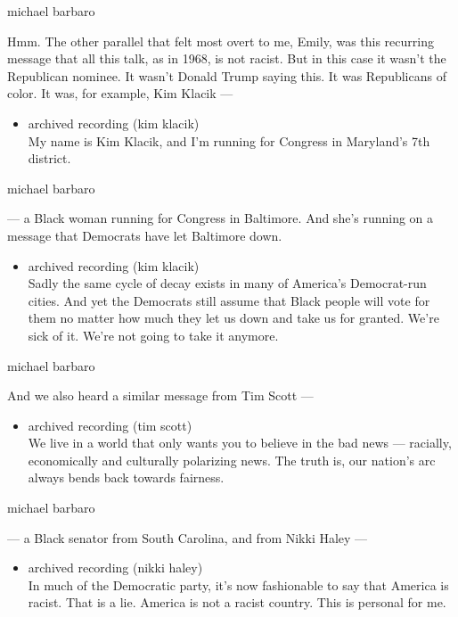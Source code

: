 michael barbaro

Hmm. The other parallel that felt most overt to me, Emily, was this
recurring message that all this talk, as in 1968, is not racist. But in
this case it wasn't the Republican nominee. It wasn't Donald Trump
saying this. It was Republicans of color. It was, for example, Kim
Klacik ---

\begin{itemize}
\tightlist
\item
  archived recording (kim klacik)\\
  My name is Kim Klacik, and I'm running for Congress in Maryland's 7th
  district.
\end{itemize}

michael barbaro

--- a Black woman running for Congress in Baltimore. And she's running
on a message that Democrats have let Baltimore down.

\begin{itemize}
\tightlist
\item
  archived recording (kim klacik)\\
  Sadly the same cycle of decay exists in many of America's Democrat-run
  cities. And yet the Democrats still assume that Black people will vote
  for them no matter how much they let us down and take us for granted.
  We're sick of it. We're not going to take it anymore.
\end{itemize}

michael barbaro

And we also heard a similar message from Tim Scott ---

\begin{itemize}
\tightlist
\item
  archived recording (tim scott)\\
  We live in a world that only wants you to believe in the bad news ---
  racially, economically and culturally polarizing news. The truth is,
  our nation's arc always bends back towards fairness.
\end{itemize}

michael barbaro

--- a Black senator from South Carolina, and from Nikki Haley ---

\begin{itemize}
\tightlist
\item
  archived recording (nikki haley)\\
  In much of the Democratic party, it's now fashionable to say that
  America is racist. That is a lie. America is not a racist country.
  This is personal for me.
\end{itemize}

